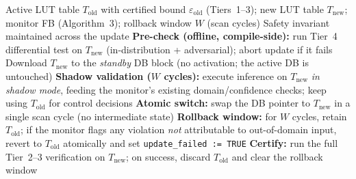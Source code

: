 \documentclass[journal,onecolumn]{IEEEtran}
\begin{document}
\begin{algorithm}[t]
\caption{Runtime LUT Hot-Swap with Downgrade Guarantee (Algorithm~4)}
\label{alg:hot_swap}
\begin{algorithmic}[1]
\Require Active LUT table $T_{\text{old}}$ with certified bound
$\varepsilon_{\text{old}}$ (Tiers~1--3); new LUT table $T_{\text{new}}$;
monitor FB (Algorithm~3); rollback window $W$ (scan cycles)
\Ensure Safety invariant maintained across the update
\State \textbf{Pre-check (offline, compile-side):} run Tier~4 differential
      test on $T_{\text{new}}$ (in-distribution + adversarial); abort
      update if it fails
\State Download $T_{\text{new}}$ to the \emph{standby} DB block
      (no activation; the active DB is untouched)
\State \textbf{Shadow validation ($W$ cycles):} execute inference on
      $T_{\text{new}}$ \emph{in shadow mode}, feeding the monitor's
      existing domain/confidence checks; keep using $T_{\text{old}}$ for
      control decisions
\State \textbf{Atomic switch:} swap the DB pointer to $T_{\text{new}}$ in
      a single scan cycle (no intermediate state)
\State \textbf{Rollback window:} for $W$ cycles, retain $T_{\text{old}}$;
      if the monitor flags any violation \emph{not} attributable to
      out-of-domain input, revert to $T_{\text{old}}$ atomically and set
      \texttt{update\_failed := TRUE}
\State \textbf{Certify:} run the full Tier~2--3 verification on
      $T_{\text{new}}$; on success, discard $T_{\text{old}}$ and clear the
      rollback window
\end{algorithmic}
\end{algorithm}
\end{document}
